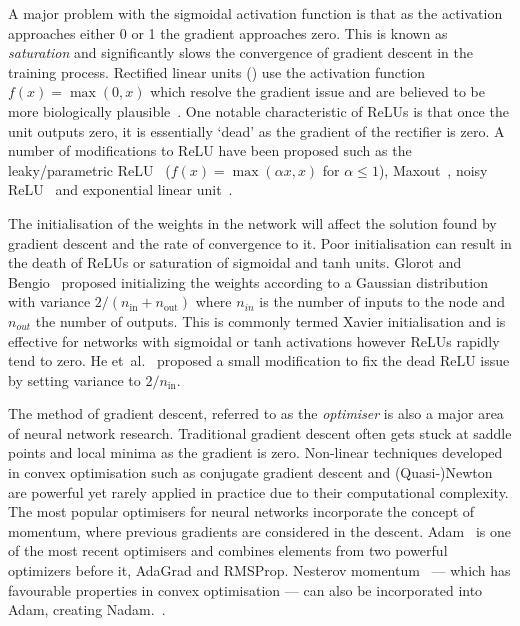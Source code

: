 \documentclass[12pt, twoside]{book}
\renewcommand\emph[1]{\textit{\color{USred}{#1}}}
\begin{document}
A major problem with the sigmoidal activation function is that as the activation approaches either 0 or 1 the gradient approaches zero. This is known as \textit{saturation} and significantly slows the convergence of gradient descent in the training process. Rectified linear units (\emph{ReLUs}) use the activation function $f(x) = \max(0,x)$ which resolve the gradient issue and are believed to be more biologically plausible~\cite{relu,relubiology}. One notable characteristic of ReLUs is that once the unit outputs zero, it is essentially `dead' as the gradient of the rectifier is zero. A number of modifications to ReLU have been proposed such as the leaky/parametric ReLU~\cite{heinitialization} ($f(x) = \max(\alpha x, x)$ for $\alpha\leq 1$), Maxout~\cite{goodfellow2013maxout}, noisy ReLU~\cite{relu} and exponential linear unit~\cite{clevert2015fast}.

The initialisation of the weights in the network will affect the solution found by gradient descent and the rate of convergence to it. Poor initialisation can result in the death of ReLUs or saturation of sigmoidal and tanh units. Glorot and Bengio~\cite{glorot2010understanding} proposed initializing the weights according to a Gaussian distribution with variance $2/(n_{\text{in}}+n_{\text{out}})$ where $n_{in}$ is the number of inputs to the node and $n_{out}$ the number of outputs. This is commonly termed Xavier initialisation and is effective for networks with sigmoidal or tanh activations however ReLUs rapidly tend to zero. He et~al.~\cite{heinitialization} proposed a small modification to fix the dead ReLU issue by setting variance to $2/n_{\text{in}}$.

The method of gradient descent, referred to as the \textit{optimiser} is also a major area of neural network research. Traditional gradient descent often gets stuck at saddle points and local minima as the gradient is zero. Non-linear techniques developed in convex optimisation such as conjugate gradient descent and (Quasi-)Newton are powerful yet rarely applied in practice due to their computational complexity. The most popular optimisers for neural networks incorporate the concept of momentum, where previous gradients are considered in the descent. Adam~\cite{adam} is one of the most recent optimisers and combines elements from two powerful optimizers before it, AdaGrad and RMSProp. Nesterov momentum~\cite{nesterov1983method} --- which has favourable properties in convex optimisation --- can also be incorporated into Adam, creating Nadam.~\cite{nadam}. 
\end{document}
